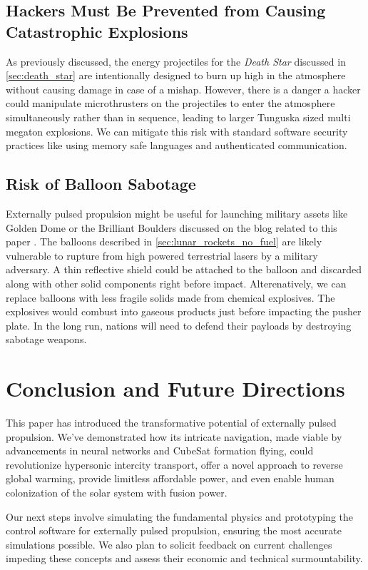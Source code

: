 \documentclass{article}
\begin{document}
\subsection{Hackers Must Be Prevented from Causing Catastrophic Explosions}
As previously discussed, the energy projectiles for the \textit{Death Star} discussed in \autoref{sec:death_star} are intentionally designed to burn up high in the atmosphere without causing damage in case of a mishap.  However, there is a danger a hacker could manipulate microthrusters on the projectiles to enter the atmosphere simultaneously rather than in sequence, leading to larger Tunguska \cite{longo2007tunguska} sized multi megaton explosions.  We can mitigate this risk with standard software security practices like using memory safe languages and authenticated communication.

\subsection{Risk of Balloon Sabotage}
Externally pulsed propulsion might be useful for launching military assets like Golden Dome \cite{lockheed_martin_golden_dome} or the Brilliant Boulders \cite{brilliant_boulders} discussed on the blog related to this paper \cite{aim2024}.   The balloons described in \autoref{sec:lunar_rockets_no_fuel} are likely vulnerable to rupture from high powered terrestrial lasers by a military adversary.  A thin reflective shield could be attached to the balloon and discarded along with other solid components right before impact.  Alterenatively, we can replace balloons with less fragile solids made from chemical explosives.  The explosives would combust into gaseous products just before impacting the pusher plate. In the long run, nations will need to defend their payloads by destroying sabotage weapons.

\section{Conclusion and Future Directions}
This paper has introduced the transformative potential of externally pulsed propulsion. We've demonstrated how its intricate navigation, made viable by advancements in neural networks and CubeSat formation flying, could revolutionize hypersonic intercity transport, offer a novel approach to reverse global warming, provide limitless affordable power, and even enable human colonization of the solar system with fusion power. 

Our next steps involve simulating the fundamental physics and prototyping the control software for externally pulsed propulsion, ensuring the most accurate simulations possible. We also plan to solicit feedback on current challenges impeding these concepts and assess their economic and technical surmountability.
\end{document}
